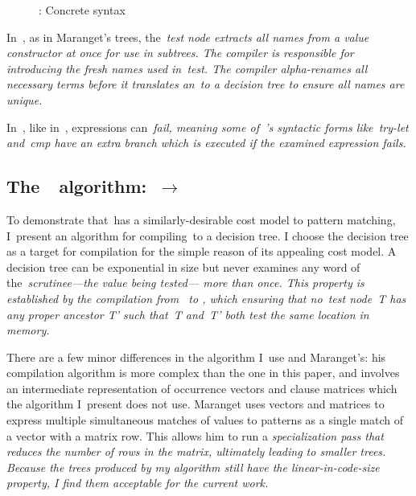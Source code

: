 \documentclass[manuscript,screen, 12pt, nonacm]{acmart}
\begin{document}
  \begin{figure}
    \begin{center}
    \dcsyntax
    \end{center}
    \caption{\D: Concrete syntax}
    \label{fig:dsyntax}
    \end{figure}



  In~\D, as in Maranget's trees, the~\it{test} node extracts all names from a
  value constructor at once for use in subtrees. The compiler is responsible for
  introducing the fresh names used in~\it{test}. The compiler alpha-renames all
  necessary terms before it translates an~\iffibf to a decision tree to ensure
  all names are unique. 

  In~\D, like in~\VMinus, expressions can~\it{fail}, meaning some of~\D's
  syntactic forms like~\it{try-let} and~\it{cmp} have an extra branch which is
  executed if the examined expression fails. 

    \label{dsemantics}
    \dsemantics


    \subsection{The~\DTran\ algorithm:~\VMinus $\rightarrow$~\D}

    To demonstrate that~\VMinus has a similarly-desirable cost model to pattern
    matching, I~present an algorithm for compiling~\VMinus to a decision tree. I
    choose the decision tree as a target for compilation for the simple reason
    of its appealing cost model. A decision tree can be exponential in size but
    never examines any word of the~\it{scrutinee}---the value being tested---%
    more than once. This property is established by the compilation from~\VMinus
    to \D, which ensuring that no~\it{test} node~\it{T} has any proper ancestor
    \it{T'} such that~\it{T} and~\it{T'} both test the same location in memory.   

    There are a few minor differences in the algorithm I~use and Maranget's: his
    compilation algorithm is more complex than the one in this paper, and
    involves an intermediate representation of occurrence vectors and clause
    matrices which the algorithm I~present does not use. Maranget uses vectors
    and matrices to express multiple simultaneous matches of values to patterns
    as a single match of a vector with a matrix row. This allows him to run a
    \it{specialization} pass that reduces the number of rows in the matrix,
    ultimately leading to smaller trees. Because the trees produced by my
    algorithm still have the linear-in-code-size property, I find them
    acceptable for the current work. 
\end{document}
